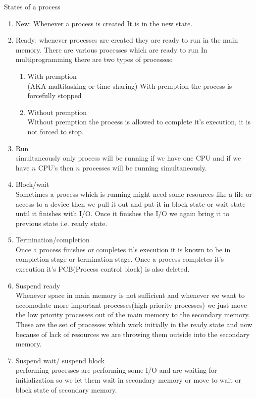 \documentclass[12pt,letterpaper]{article}
\begin{document}
States of a process
\begin{enumerate}
  \item New: Whenever a process is created It is in the new state.
  \item Ready: whenever processes are created they are ready to run in the main memory. There are various processes which are ready to run
    In multiprogramming there are two types of processes: 
    \begin{enumerate}
      \item With premption\\
        (AKA multitasking or time sharing)
        With premption the process is forcefully stopped 
      \item Without premption\\
        Without premption the process is allowed to complete it's execution, it is not forced to stop.
    \end{enumerate}
  \item Run\\
    simultaneously only process will be running if we have one CPU and if we have $n$ CPU's then $n$ processes will be running simultaneously.
  \item Block/wait\\
    Sometimes a process which is running might need some resources like a file or access to a device then we pull it out and put it in block state or wait state until it finishes with I/O. Once it finishes the I/O we again bring it to previous state i.e. ready state.  
  \item Termination/completion\\
    Once a process finishes or completes it's execution it is known to be in completion stage or termination stage. Once a process completes it's execution it's PCB(Process control block) is also deleted. 
  \item Suspend ready\\
    Whenever space in main memory is not sufficient and whenever we want to accomodate more important processes(high priority processes) we just move the low priority processes out of the main memory to the secondary memory. 
    These are the set of processes which work initially in the ready state and now because of lack of resources we are throwing them outside into the secondary memory. 
  \item Suspend wait/ suspend block\\
    performing processes are performing some I/O and are waiting for initialization so we let them wait in secondary memory or move to wait or block state of secondary memory. 
\end{enumerate}
\end{document}
